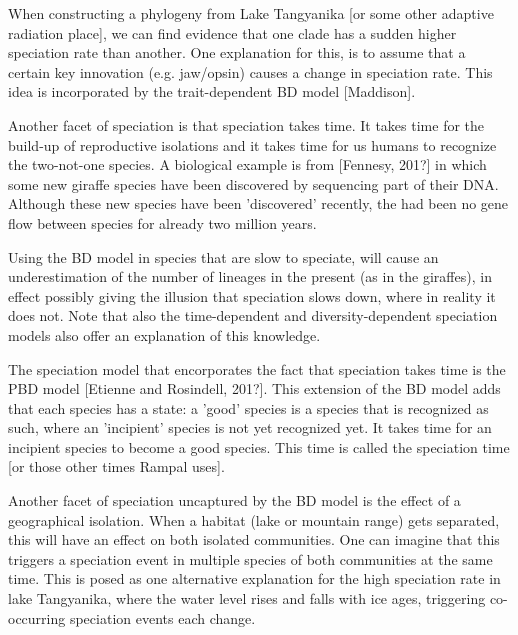 When constructing a phylogeny from Lake Tangyanika [or some
other adaptive radiation place], we can find evidence that
one clade has a sudden higher speciation rate than another.
One explanation for this, is to assume that a certain key
innovation (e.g. jaw/opsin) causes a change in speciation
rate. This idea is incorporated by the trait-dependent 
BD model [Maddison].

%
%
%

Another facet of speciation is that speciation takes time. It
takes time for the build-up of reproductive isolations and it
takes time for us humans to recognize the two-not-one species.
A biological example is from [Fennesy, 201?] in which
some new giraffe species have been discovered by sequencing
part of their DNA. Although these new species have been
'discovered' recently, the had been no gene flow between species
for already two million years.

%
%
%

Using the BD model in species that are slow to speciate, will cause
an underestimation of the number of lineages in the present (as in the
giraffes), in effect possibly giving the illusion that speciation 
slows down, where in reality it does not. Note that also the
time-dependent and diversity-dependent speciation models also
offer an explanation of this knowledge.

%
%
%
%
%

The speciation model that encorporates the fact that speciation takes
time is the PBD model [Etienne and Rosindell, 201?]. This extension of the
BD model adds that each species has a state: a 'good' species is
a species that is recognized as such, where an 'incipient' species is
not yet recognized yet. It takes time for an incipient species to
become a good species. This time is called the speciation time [or those
other times Rampal uses].

%
%
%

Another facet of speciation uncaptured by the BD model is the
effect of a geographical isolation. When a habitat (lake or mountain range)
gets separated, this will have an effect on both isolated communities.
One can imagine that this triggers a speciation event in multiple species
of both communities at the same time. This is posed as one alternative
explanation for the high speciation rate in lake Tangyanika, where the water 
level rises and falls with ice ages, triggering co-occurring speciation
events each change. 

